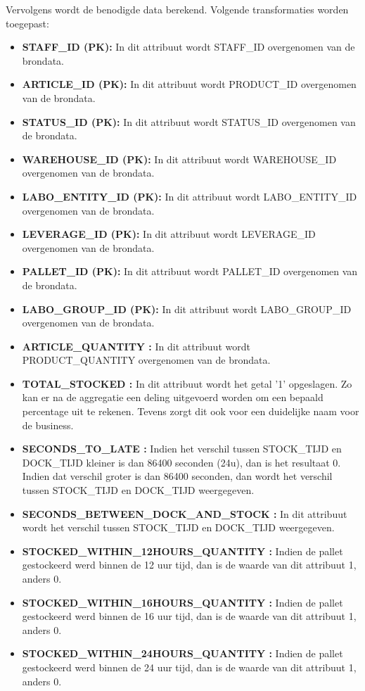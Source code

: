 Vervolgens wordt de benodigde data berekend. Volgende transformaties worden toegepast:

\begin{itemize}
	\item \textbf{STAFF\_ID (PK):} In dit attribuut wordt STAFF\_ID overgenomen van de brondata.
	\item \textbf{ARTICLE\_ID (PK):} In dit attribuut wordt PRODUCT\_ID overgenomen van de brondata.
	\item \textbf{STATUS\_ID (PK):} In dit attribuut wordt STATUS\_ID overgenomen van de brondata.
	\item \textbf{WAREHOUSE\_ID (PK):} In dit attribuut wordt WAREHOUSE\_ID overgenomen van de brondata.
	\item \textbf{LABO\_ENTITY\_ID (PK):} In dit attribuut wordt LABO\_ENTITY\_ID overgenomen van de brondata.
	\item \textbf{LEVERAGE\_ID (PK):} In dit attribuut wordt LEVERAGE\_ID overgenomen van de brondata.
	\item \textbf{PALLET\_ID (PK):} In dit attribuut wordt PALLET\_ID overgenomen van de brondata.
	\item \textbf{LABO\_GROUP\_ID (PK):} In dit attribuut wordt LABO\_GROUP\_ID overgenomen van de brondata.
	\item \textbf{ARTICLE\_QUANTITY :} In dit attribuut wordt PRODUCT\_QUANTITY overgenomen van de brondata.
	\item \textbf{TOTAL\_STOCKED :} In dit attribuut wordt het getal '1' opgeslagen. Zo kan er na de aggregatie een deling uitgevoerd worden om een bepaald percentage uit te rekenen. Tevens zorgt dit ook voor een duidelijke naam voor de business.
	\item \textbf{SECONDS\_TO\_LATE :} Indien het verschil tussen STOCK\_TIJD en DOCK\_TIJD kleiner is dan 86400 seconden (24u), dan is het resultaat 0. Indien dat verschil groter is dan 86400 seconden, dan wordt het verschil tussen STOCK\_TIJD en DOCK\_TIJD weergegeven.
	\item \textbf{SECONDS\_BETWEEN\_DOCK\_AND\_STOCK :} In dit attribuut wordt het verschil tussen STOCK\_TIJD en DOCK\_TIJD weergegeven.
	\item \textbf{STOCKED\_WITHIN\_12HOURS\_QUANTITY :} Indien de pallet gestockeerd werd binnen de 12 uur tijd, dan is de waarde van dit attribuut 1, anders 0.
	\item \textbf{STOCKED\_WITHIN\_16HOURS\_QUANTITY :} Indien de pallet gestockeerd werd binnen de 16 uur tijd, dan is de waarde van dit attribuut 1, anders 0.
	\item \textbf{STOCKED\_WITHIN\_24HOURS\_QUANTITY :} Indien de pallet gestockeerd werd binnen de 24 uur tijd, dan is de waarde van dit attribuut 1, anders 0.
\end{itemize} 

